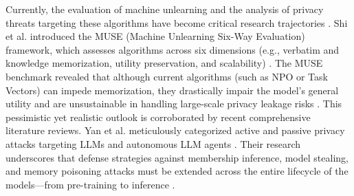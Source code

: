 \documentclass[conference]{IEEEtran}
\begin{document}
Currently, the evaluation of machine unlearning and the analysis of privacy threats targeting these algorithms have 
become critical research trajectories \cite{YAN2025100300, ICLR2025_4556f539}. Shi et al. introduced the 
MUSE (Machine Unlearning Six-Way Evaluation) framework, which assesses algorithms across six dimensions 
(e.g., verbatim and knowledge memorization, utility preservation, and scalability) \cite{ICLR2025_4556f539}. The MUSE benchmark 
revealed that although current algorithms (such as NPO or Task Vectors) can impede memorization, they drastically impair the 
model's general utility and are unsustainable in handling large-scale privacy leakage risks \cite{ICLR2025_4556f539}. 
This pessimistic yet realistic outlook is corroborated by recent comprehensive literature reviews. Yan et al. meticulously 
categorized active and passive privacy attacks targeting LLMs and autonomous LLM agents \cite{YAN2025100300}. 
Their research underscores that defense strategies against membership inference, model stealing, and memory poisoning attacks 
must be extended across the entire lifecycle of the models—from pre-training to inference \cite{YAN2025100300}.



\end{document}
